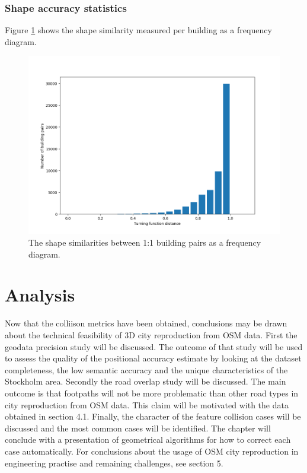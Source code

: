 \documentclass{kththesis}
\begin{document}
\subsubsection{Shape accuracy statistics}

Figure \ref{fig:bar-plot-similarity} shows the shape similarity measured per building as a frequency diagram.

\begin{figure}[H]
    \centering
    \includegraphics[width=\textwidth,height=0.5\textheight,keepaspectratio]{img_turning_function_plot}
    \caption{The shape similarities between 1:1 building pairs as a frequency diagram.}
    \label{fig:bar-plot-similarity}
\end{figure}

\section{Analysis}

Now that the colliison metrics have been obtained, conclusions may be drawn about the technical feasibility of 3D city reproduction from OSM data.
First the geodata precision study will be discussed.
The outcome of that study will be used to assess the quality of the positional accuracy estimate by looking at the dataset completeness, the low semantic accuracy and the unique characteristics of the Stockholm area.
Secondly the road overlap study will be discussed.
The main outcome is that footpaths will not be more problematic than other road types in city reproduction from OSM data.
This claim will be motivated with the data obtained in section 4.1.
Finally, the character of the feature collision cases will be discussed and the most common cases will be identified.
The chapter will conclude with a presentation of geometrical algorithms for how to correct each case automatically.
For conclusions about the usage of OSM city reproduction in engineering practise and remaining challenges, see section 5.
\end{document}
